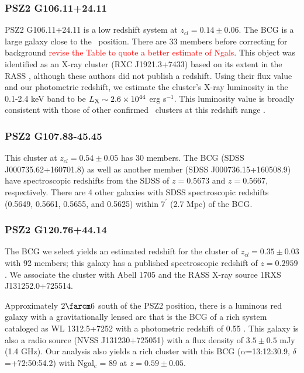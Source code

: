 \documentclass[apj, revtex4-1]{emulateapj}
\newcommand{\editorial}[1]{\textcolor{red}{#1}}
\begin{document}
\subsubsection{PSZ2 G106.11+24.11} %
PSZ2 G106.11+24.11 is a low redshift system at $z_{cl} = 0.14 \pm 0.06$. The BCG is a large galaxy close to the \planck\ position. There are 33 members before correcting for background \editorial{revise the Table to quote a better estimate of Ngals}. This object was identified as an X-ray cluster (RXC J1921.3+7433) based on its extent in the RASS \citep{Bohringer2000}, although these authors did not publish a redshift. Using their flux value and our photometric redshift, we estimate the cluster's X-ray luminosity in the 0.1-2.4 keV band to be $L_{\rm X} \sim 2.6\times 10^{44}$ erg s$^{-1}$. This luminosity value is broadly consistent with those of other confirmed \planck\ clusters at this redshift range \citep{PlanckCollaboration2015}.

\subsubsection{PSZ2 G107.83-45.45} %
This cluster at $z_{cl} = 0.54 \pm 0.05$ has 30 members. The BCG (SDSS J000735.62+160701.8) as well as another member (SDSS J000736.15+160508.9) have spectroscopic redshifts from the SDSS of $z=0.5673$ and $z=0.5667$, respectively. There are 4 other galaxies with SDSS spectroscopic redshifts (0.5649, 0.5661, 0.5655, and 0.5625) within $7^\prime$ (2.7 Mpc) of the BCG.

\subsubsection{PSZ2 G120.76+44.14} %
The BCG we select yields an estimated redshift for the cluster of $z_{cl} = 0.35 \pm 0.03$ with 92 members; this galaxy has a published spectroscopic redshift of $z=0.2959$ \citep{Huchra1990}. We associate the cluster with Abell 1705 and the RASS X-ray source 1RXS J131252.0+725514.

Approximately $2\farcm6$ south of the PSZ2 position, there is a luminous red galaxy with a gravitationally lensed arc that is the BCG of a rich system cataloged as WL 1312.5+7252 with a photometric redshift of 0.55 \citep{Dahle2003}. This galaxy is also a radio source (NVSS J131230+725051) with a flux density of $3.5 \pm 0.5$ mJy (1.4 GHz). Our analysis also yields a rich cluster with this BCG ($\alpha$=13:12:30.9, $\delta$=+72:50:54.2) with Ngal$_c$ = 89 at $z=0.59 \pm 0.05$.
\end{document}
